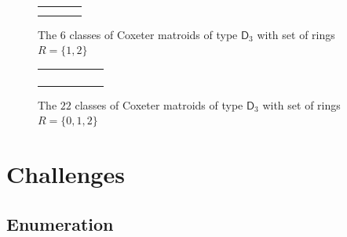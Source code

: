 \documentclass[11pt]{amsart}
\newcommand\DD{{\mathsf D}}
\theoremstyle{definition}
\begin{document}
\begin{figure}[htbp]
  \centering
  \begin{tabular}{cccc}
    
    & 
    
    & 
    
    & 
    
    \\
    
    & 
    
  \end{tabular}
  \caption{The $6$ classes of Coxeter matroids of type $\DD_3$ with set of rings $R=\{1,2\}$}
  \label{fig:d3_1_2}
\end{figure}

\begin{figure}[htbp]
  \centering
  \begin{tabular}{cccccc}
    
    & 
      
    & 
      
    & 
      
    &
    
    & 
    
    \\ 
    
    & 
      
    & 
      
    & 
      
    &
    
    & 
    
    \\ 
    
    & 
      
    & 
      
    & 
      
    &
    
    & 
    
    \\ 
    
    & 
      
    & 
      
    & 
      
  \end{tabular}
  \caption{The $22$ classes of Coxeter matroids of type $\DD_3$ with set of rings $R=\{0,1,2\}$}
  \label{fig:d3_0_1_2}
\end{figure}

\section{Challenges}

\subsection{Enumeration}
\end{document}
